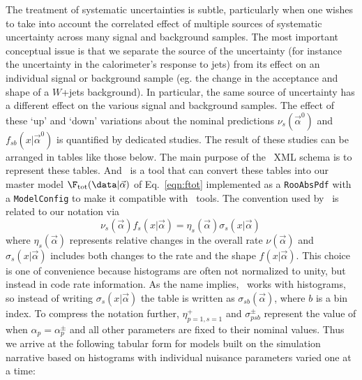 The treatment of systematic uncertainties is subtle, particularly when one wishes to take into account the correlated effect of multiple sources of systematic uncertainty across many signal and background samples.   
The most important conceptual issue is that we separate the source of the uncertainty (for instance the uncertainty in the calorimeter's response to jets) from its effect on an individual signal or background sample (eg. the change in the acceptance and shape of a $W$+jets background).  In particular, the same source of uncertainty has a different effect on the various signal and background samples.  The effect of these `up' and `down' variations about the nominal predictions $\nu_s(\vec\alpha^0)$  and $f_{sb}(x|\vec\alpha^0)$ is quantified by dedicated studies.   The result of these studies can be arranged in tables like those below.  The main purpose of the \HF\ XML schema is to represent these tables.  And \HF\ is a tool that can convert these tables into our master model $\F_{\rm tot}(\data |\vec\alpha)$ of Eq.~\ref{eqn:ftot} implemented as a  \texttt{RooAbsPdf} with a  \texttt{ModelConfig} to make it compatible with \roostats\ tools.  The convention used by \HF\ is related to our notation via 
\begin{equation}
\nu_s(\vec\alpha) f_s(x|\vec\alpha) = \eta_{s}(\vec\alpha) \sigma_{s}(x|\vec\alpha) \, 
\end{equation}
where  $\eta_{s}(\vec\alpha)$ represents relative changes in the overall rate $\nu(\vec\alpha)$  and $\sigma_{s}(x|\vec\alpha)$ includes both changes to the rate and the shape $f(x|\vec\alpha)$.  This choice is one of convenience because histograms are often not normalized to unity, but instead in code rate information.  As the name implies, \HF\ works with histograms, so instead of writing $\sigma_{s}(x|\vec\alpha)$ the table is written as $\sigma_{sb}(\vec\alpha)$, where $b$ is a bin index. To compress the notation further, $\eta_{p=1,s=1}^+$ and $\sigma_{psb}^\pm$ represent the value of when $\alpha_p=\alpha_p^\pm$ and all other parameters are fixed to their nominal values.  Thus we arrive at the following tabular form for models built on the simulation narrative based on histograms with individual nuisance parameters varied one at a time:
